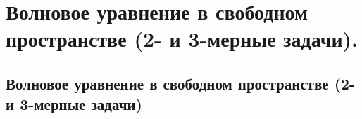 \chapter{Волновое уравнение в свободном пространстве (2- и 3-мерные задачи).}

\section{Волновое уравнение в свободном пространстве (2- и 3-мерные задачи)}
\newpage
